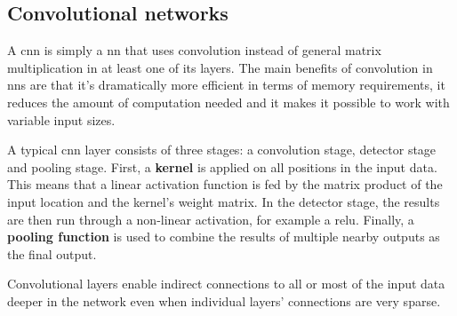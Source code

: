 \subsection{Convolutional networks}

A \ac{cnn} is simply a \ac{nn} that uses convolution instead of general matrix
multiplication in at least one of its layers. The main benefits of convolution in \ac{nn}s
are that it's dramatically more efficient in terms of memory requirements, it reduces
the amount of computation needed and it makes it possible to work with variable input
sizes.

A typical \ac{cnn} layer consists of three stages: a convolution stage, detector stage
and pooling stage. First, a \textbf{kernel} is applied on all positions in the input
data. This means that a linear activation function is fed by the matrix product of the
input location and the kernel's weight matrix. In the detector stage, the results are
then run through a non-linear activation, for example a \ac{relu}. Finally, a \textbf{pooling
function} is used to combine the results of multiple nearby outputs as the final output.

Convolutional layers enable indirect connections to all or most of the input data deeper
in the network even when individual layers' connections are very sparse.
